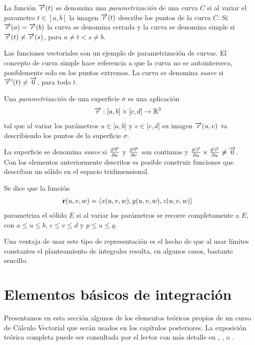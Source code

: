   \begin{tcolorbox}[title=\bf Curva parametrizada]
    La funci\'on $\overrightarrow{r}(t)$ se denomina una \emph{parametrizaci\'on} de una curva $C$ si
    al variar el parametro $t\in [a,b]$ la imagen $\overrightarrow{r}(t)$ describe los puntos de la curva $C$.
    Si $\overrightarrow{r}(a)=\overrightarrow{r}(b)$ la curva se denomina cerrada y la curva se denomina simple si $\overrightarrow{r}(t)\neq \overrightarrow{r}(s)$,
    para $a\neq t<s\neq b$.
  \end{tcolorbox}

  Las funciones vectoriales son un ejemplo de parametrización de curvas.
  El concepto de curva simple hace referencia a que la curva no se autointerseca, posiblemente solo en los puntos extremos.
  La curva se denomina \emph{suave} si $\overrightarrow{r}^\prime(t) \neq \overrightarrow{0}$, para todo $t$. 

  \begin{tcolorbox}[title=\bf Superficie parametrizada]
    Una \emph{parametrización} de una superficie $\sigma $
  es una aplicación $$\overrightarrow{r}:[a,b]\times \lbrack c,d]\rightarrow \mathbb{R}^{3}$$
tal que al variar los parámetros $u\in \lbrack a,b]$ y $v\in \lbrack c,d]$
su imagen $\overrightarrow{r}(u,v)$ va describiendo los puntos de la superficie $\sigma $.
\end{tcolorbox}
La superficie se denomina \emph{suave} si $\frac{\partial \overrightarrow{r}}{\partial u}$ y
$\frac{\partial \overrightarrow{r}}{\partial v} $ son continuas y
$\frac{\partial \overrightarrow{r}}{\partial u} \times \frac{\partial \overrightarrow{r}}{\partial u} \neq \overrightarrow{0}$.
%
Con los elementos anteriormente descritos es posible construir funciones
que describan un sólido en el espacio tridimensional.
\begin{tcolorbox}[title=\bf Parametrización de un sólido]
Se dice que la función $${\bf r}(u,v,w)= \langle x(u,v,w), y(u,v,w),z(u,v,w) \rangle $$
parametriza el sólido $E$ si al variar los parámetros se recorre completamente a $E$,
con $a \leq u \leq b$, $c \leq v \leq d$ y $p \leq u \leq q$.
\end{tcolorbox}

Una ventaja de usar este tipo de representación es el hecho de que al usar límites constantes el planteamiento de integrales
resulta, en algunos casos, bastante sencillo.

\section{Elementos básicos de integración}

Presentamos en esta sección algunos de los elementos teóricos propios de un curso de
Cálculo Vectorial que serán usados en los capítulos posteriores. La exposición teórica completa puede ser consultada
por el lector con más detalle en \cite{apostol_alisis_1981}, \cite{marsden_calculo_2013}, \cite{stewart_calculo_2018} o \cite{thomas_calculo_2015}.

